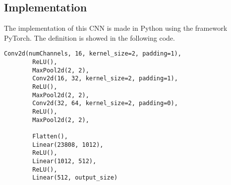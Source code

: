\subsection{Implementation}
The implementation of this CNN is made in Python using the framework PyTorch. The definition is showed in the following code.
\begin{lstlisting}[basicstyle=\tiny,]
		Conv2d(numChannels, 16, kernel_size=2, padding=1),
		ReLU(),
		MaxPool2d(2, 2),
		Conv2d(16, 32, kernel_size=2, padding=1),
		ReLU(),
		MaxPool2d(2, 2),
		Conv2d(32, 64, kernel_size=2, padding=0),
		ReLU(),
		MaxPool2d(2, 2),
		
		Flatten(),
		Linear(23808, 1012),
		ReLU(),
		Linear(1012, 512),
		ReLU(),
		Linear(512, output_size)
\end{lstlisting}
